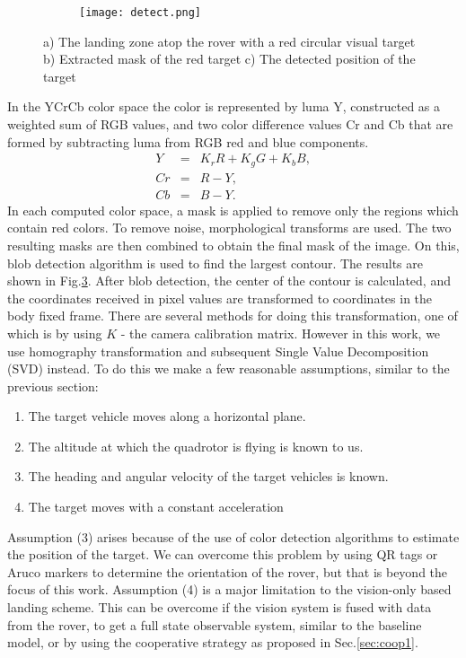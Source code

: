\documentclass[conf]{new-aiaa}
\begin{document}
\begin{figure}[t]
\begin{subfigure}{0.25\textwidth}
    \caption{} \label{fig:mask}
  \end{subfigure}%
  \hspace*{\fill}   
  \begin{subfigure}{0.25\textwidth}
    \texttt{[image: detect.png]}
    \caption{} \label{fig:detect}
  \end{subfigure}%
  \hspace*{\fill} 
 \caption{a) The landing zone atop the rover with a red circular visual target b) Extracted mask of the red target c) The detected position of the target} \label{fig:vision_find}
\end{figure}

In the YCrCb color space the color is represented by luma Y, constructed as a weighted sum of RGB values, and two color difference values Cr and Cb that are formed by subtracting luma from RGB red and blue components.
\begin{eqnarray}
Y &=& K_{r}R + K_{g}G + K_{b}B,\\
Cr &=& R-Y,\\
Cb &=& B-Y.
\end{eqnarray}
In each computed color space, a mask is applied to remove only the regions which contain red colors. To remove noise, morphological transforms are used. The two resulting masks are then combined to obtain the final mask of the image. On this, blob detection algorithm is used to find the largest contour. The results are shown in Fig.\ref{fig:vision_find}. After blob detection, the center of the contour is calculated, and the coordinates received in pixel values are transformed to coordinates in the body fixed frame. There are several methods for doing this transformation, one of which is by using $K$ - the camera calibration matrix. However in this work, we use homography transformation and subsequent Single Value Decomposition (SVD) instead. To do this we make a few reasonable assumptions, similar to the previous section:
\begin{enumerate}
\item The target vehicle moves along a horizontal plane.
\item The altitude at which the quadrotor is flying is known to us.
\item The heading and angular velocity of the target vehicles is known. 
\item The target moves with a constant acceleration
\end{enumerate} 
Assumption (3) arises because of the use of color detection algorithms to estimate the position of the target. We can overcome this problem by using QR tags or Aruco markers to determine the orientation of the rover, but that is beyond the focus of this work. Assumption (4) is a major limitation to the vision-only based landing scheme. This can be overcome if the vision system is fused with data from the rover, to get a full state observable system, similar to the baseline model, or by using the cooperative strategy as proposed in Sec.\ref{sec:coop1}.
\end{document}
